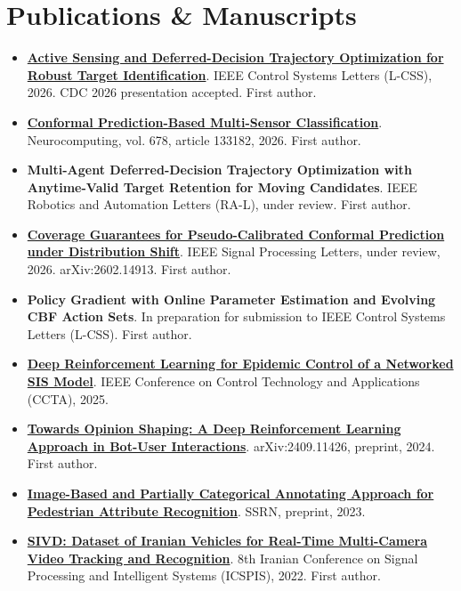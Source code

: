 \documentclass[letterpaper,11pt]{article}
\newcommand{\paper}[3]{\item \textbf{\href{#3}{#1}}. #2.}
\newcommand{\manuscript}[2]{\item \textbf{#1}. #2.}
\begin{document}
\section{Publications \& Manuscripts}
\begin{itemize}
\paper{Active Sensing and Deferred-Decision Trajectory Optimization for Robust Target Identification}
{IEEE Control Systems Letters (L-CSS), 2026. CDC 2026 presentation accepted. First author}
{https://doi.org/10.1109/LCSYS.2026.3703893}
\paper{Conformal Prediction-Based Multi-Sensor Classification}
{Neurocomputing, vol. 678, article 133182, 2026. First author}
{https://doi.org/10.1016/j.neucom.2026.133182}
\manuscript{Multi-Agent Deferred-Decision Trajectory Optimization with Anytime-Valid Target Retention for Moving Candidates}
{IEEE Robotics and Automation Letters (RA-L), under review. First author}
\paper{Coverage Guarantees for Pseudo-Calibrated Conformal Prediction under Distribution Shift}
{IEEE Signal Processing Letters, under review, 2026. arXiv:2602.14913. First author}
{https://arxiv.org/abs/2602.14913}
\manuscript{Policy Gradient with Online Parameter Estimation and Evolving CBF Action Sets}
{In preparation for submission to IEEE Control Systems Letters (L-CSS). First author}
\paper{Deep Reinforcement Learning for Epidemic Control of a Networked SIS Model}
{IEEE Conference on Control Technology and Applications (CCTA), 2025}
{https://ieeexplore.ieee.org/document/11151322}
\paper{Towards Opinion Shaping: A Deep Reinforcement Learning Approach in Bot-User Interactions}
{arXiv:2409.11426, preprint, 2024. First author}
{https://arxiv.org/abs/2409.11426}
\paper{Image-Based and Partially Categorical Annotating Approach for Pedestrian Attribute Recognition}
{SSRN, preprint, 2023}
{https://papers.ssrn.com/sol3/papers.cfm?abstract_id=4373086}
\paper{SIVD: Dataset of Iranian Vehicles for Real-Time Multi-Camera Video Tracking and Recognition}
{8th Iranian Conference on Signal Processing and Intelligent Systems (ICSPIS), 2022. First author}
{https://ieeexplore.ieee.org/document/10043932}
\end{itemize}
\end{document}
